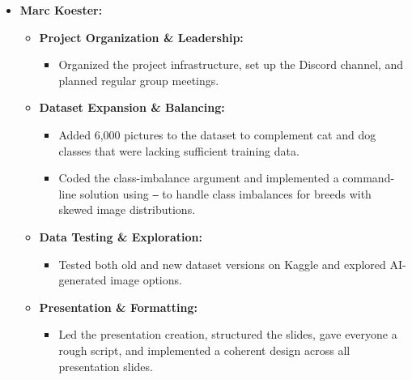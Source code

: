 \begin{itemize}
\begin{itemize}
\begin{itemize}
            \item Created an automated logging, regex-parsing, and graphing pipeline to visualize multi-epoch \textbf{loss and accuracy curves} (e.g., tracking training vs. validation performance, highlighting optimal checkpoints and maximum validation accuracies) \cite{prechelt1998early}.
        \end{itemize}
        \item \textbf{Documentation \& Project Structuring:}
        \begin{itemize}
            \item Structured, drafted, and authored the comprehensive final project report and documentation, outlining the end-to-end computer vision pipeline, experimental setups, hyperparameter configurations, quantitative evaluations, and visual interpretability insights.
        \end{itemize}
    \end{itemize}

    \item \textbf{Marc Koester:}
    \begin{itemize}
        \item \textbf{Project Organization \& Leadership:}
        \begin{itemize}
            \item Organized the project infrastructure, set up the Discord channel, and planned regular group meetings.
        \end{itemize}
        \item \textbf{Dataset Expansion \& Balancing:}
        \begin{itemize}
            \item Added 6,000 pictures to the dataset to complement cat and dog classes that were lacking sufficient training data.
            \item Coded the class-imbalance argument and implemented a command-line solution using \texttt{--} to handle class imbalances for breeds with skewed image distributions.
        \end{itemize}
        \item \textbf{Data Testing \& Exploration:}
        \begin{itemize}
            \item Tested both old and new dataset versions on Kaggle and explored AI-generated image options.
        \end{itemize}
        \item \textbf{Presentation \& Formatting:}
        \begin{itemize}
            \item Led the presentation creation, structured the slides, gave everyone a rough script, and implemented a coherent design across all presentation slides.
        \end{itemize}
    \end{itemize}



\end{itemize}
